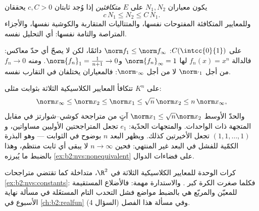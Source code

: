 \begin{definition}\label{def:b2:nvs:equivalent}
يكون معياران $N_1, N_2$ على $E$ \emph{متكافئين} إذا وُجد ثابتان $c, C > 0$ يحققان
\[
c\,N_1 \leq N_2 \leq C\, N_1 .
\]
وللمعايير المتكافئة المفتوحات نفسها، والمتتاليات المتقاربة
والكوشية نفسها، والأجزاء المتراصة والتامة نفسها: أي التحليل نفسه.
\end{definition}

\begin{example}\label{ex:b2:nvs:nonequivalent}
على $C(\intcc{0}{1})$: $\norm f_1 \leq \norm f_\infty$ دائمًا، لكن
لا يصحّ أي حدّ معاكس: فالدالة $f_n(x) = x^n$ لها $\norm{f_n}_\infty = 1$
و$\norm{f_n}_1 = \frac{1}{n+1} \to 0$. ومنه $f_n \to 0$ من أجل
$\norm\cdot_1$ لا من أجل $\norm\cdot_\infty$: فالمعياران
يختلفان في التقارب نفسه.
\end{example}

\begin{example}\label{ex:b2:nvs:constants}
على $K^n$ تتكافأ المعايير الكلاسيكية الثلاثة بثوابت
مثلى:
\[
\norm x_\infty \leq \norm x_2 \leq \norm x_1
\leq \sqrt n\,\norm x_2 \leq n\,\norm x_\infty ,
\]
والحدّ الأوسط $\norm x_1 \leq \sqrt n\norm x_2$ آتٍ من
متراجحة كوشي--شوارتز في مقابل المتجهة ذات الواحدات. والمتجهات الحدّية:
$e_1$ تجعل المتراجحتين الأوليين مساواتين، و$(1, 1,
\dots, 1)$ تجعل الأخيرتين كذلك. ويظهر البعد $n$ بوضوح في
الثوابت --- وهو البذرة الكمّية للفشل في البعد غير
المنتهي: فحين $n \to \infty$ لا يبقى أي ثابت منتظم،
وهذا بالضبط ما يُبرزه \cref{ex:b2:nvs:nonequivalent} على
فضاءات الدوال.
\end{example}

\begin{omfigure}

{\small كرات الوحدة للمعايير الكلاسيكية الثلاثة في $\R^2$،
متداخلة كما تقتضي متراجحات \cref{ex:b2:nvs:constants}:
فكلما صغرت الكرة كبر . والاستدارة مهمة: فالأضلاع
المستقيمة للمعيّن والمربّع هي بالضبط مواضع فشل
التحدب التام المستغَلة في مسألة نهاية الأسبوع في \cref{ch:b2:realfun}
وفي مسألة هذا الفصل (السؤال 4).}
\end{omfigure}

